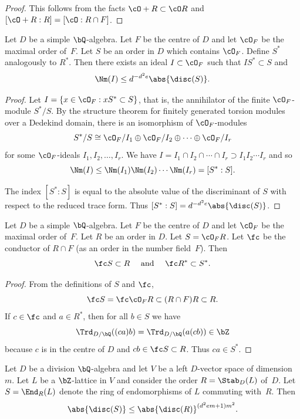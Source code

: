 \begin{proof}
This follows from the facts $\cO + R \subset \cO R$ and $[\cO + R : R] = [\cO : R \cap F]$.
\end{proof}

\begin{lemma} \label{dual-ideal}
Let $D$ be a simple $\bQ$-algebra.
Let $F$ be the centre of $D$ and let $\cO_F$ be the maximal order of~$F$.
Let $S$ be an order in $D$ which contains $\cO_F$.
Define $S^*$ analogously to $R^*$.
Then there exists an ideal $I \subset \cO_F$ such that $IS^* \subset S$ and
\[
\Nm(I) \leq d^{-d^2e} \abs{\disc(S)}.
\]
\end{lemma}

\begin{proof}
Let $I = \{ x \in \cO_F : xS^* \subset S \}$, that is, the annihilator of the finite $\cO_F$\nobreakdash-mod\-ule $S^*/S$.
By the structure theorem for finitely generated torsion modules over a Dedekind domain, there is an isomorphism of $\cO_F$-modules
\[
S^*/S \cong \cO_F/I_1 \oplus \cO_F/I_2 \oplus \dotsb \oplus \cO_F/I_r
\]
for some $\cO_F$-ideals $I_1, I_2, \dotsc, I_r$.
We have $I = I_1 \cap I_2 \cap \dotsb \cap I_r \supset I_1 I_2 \dotsm I_r$ and so
\[
\Nm(I) \leq \Nm(I_1)\Nm(I_2) \dotsm \Nm(I_r) = [S^*:S].
\]

The index $[S^*:S]$ is equal to the absolute value of the discriminant of $S$ with respect to the reduced trace form. Thus $[S^*:S] = d^{-d^2e} \abs{\disc(S)}$.
\end{proof}

\begin{lemma} \label{conductor-S}
Let $D$ be a simple $\bQ$-algebra.
Let $F$ be the centre of $D$ and let $\cO_F$ be the maximal order of~$F$.
Let $R$ be an order in $D$.
Let $S = \cO_F R$.
Let $\fc$ be the conductor of $R \cap F$ (as an order in the number field~$F$).
Then
\[
\fc S \subset R \quad \text{ and } \quad \fc R^* \subset S^*.
\]
\end{lemma}

\begin{proof}
From the definitions of $S$ and $\fc$,
\[
\fc S = \fc \cO_F R \subset (R \cap F) R \subset R.
\]
If $c \in \fc$ and $a \in R^*$, then for all $b \in S$ we have
\[
\Trd_{D/\bQ}((ca)b) = \Trd_{D/\bQ}(a(cb)) \in \bZ
\]
because $c$ is in the centre of $D$ and $cb \in \fc S \subset R$.
Thus $ca \in S^*$.
\end{proof}

\begin{lemma} \label{disc-R-S}
Let $D$ be a division $\bQ$-algebra and let $V$ be a left $D$-vector space of dimension~$m$.
Let $L$ be a $\bZ$-lattice in $V$ and consider the order $R = \Stab_D(L)$ of~$D$.
Let $S = \End_R(L)$ denote the ring of endomorphisms of $L$ commuting with~$R$.
Then
\[
\abs{\disc(S)} \leq \abs{\disc(R)}^{(d^2em+1)m^2}.
\]
\end{lemma}

